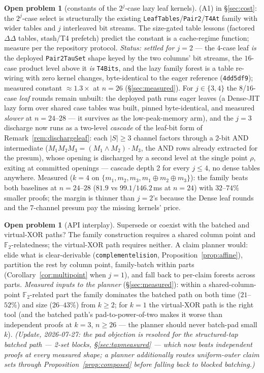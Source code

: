 \documentclass[11pt]{article}
\newcommand{\F}{\mathbb{F}}
\newcommand{\Ftwo}{\F_2}
\DeclareRobustCommand{\code}[1]{{\def\_{\textunderscore\allowbreak}\texttt{#1}}}
\theoremstyle{plain}
\theoremstyle{definition}
\newtheorem{openproblem}[theorem]{Open problem}
\theoremstyle{remark}
\begin{document}
\begin{openproblem}[constants of the $2^{j}$-case lazy leaf kernels]
(A1) in \S\ref{sec:cost}: the $2^{j}$-case select is structurally the
existing \code{LeafTables}/\code{Pair2}/\code{T4At} family with wider tables
and $j$ interleaved bit streams. The size-gated table lessons (factored
$\Delta\Delta$ tables, stash/T4 prefetch) predict the constant is a
cache-regime function; measure per the repository protocol.
\emph{Status: settled for $j=2$} --- the $4$-case leaf \emph{is} the
deployed \code{Pair2TauSet} shape keyed by the two columns' bit streams,
the $16$-case product level above it \emph{is} \code{T4Bits}, and the lazy
family forest is a table re-wiring with zero kernel changes, byte-identical
to the eager reference (\texttt{4dd5df9}); measured constant
${\approx}1.3\times$ at $n=26$ (\S\ref{sec:measured}). For
$j\in\{3,4\}$ the $8$/$16$-case \emph{leaf} rounds remain unbuilt: the
deployed path runs eager leaves (a Dense-JIT lazy form over shared case
tables was built, pinned byte-identical, and measured \emph{slower} at
$n=24$--$28$ --- it survives as the low-peak-memory arm), and the $j=3$
discharge now runs as a two-level \emph{cascade} of the leaf-bit form of
Remark~\ref{rem:dischargeleaf}: each $|S|\ge3$ channel factors through a
2-bit AND intermediate ($M_1M_2M_3=(M_1\wedge M_2)\cdot M_3$, the AND
rows already extracted for the presum), whose opening is discharged by a
second level at the single point $\rho$, exiting at committed openings
--- cascade depth 2 for every $j\le4$, no dense tables anywhere. Measured
($k=4$ on $\{m_1,m_2,m_3,m_1{\oplus}m_2{\oplus}m_3\}$): the family beats
both baselines at $n=24$--$28$ ($81.9$ vs $99.1$/$146.2$\,ms at $n=24$)
with $32$--$74\%$ smaller proofs; the margin is thinner than $j=2$'s
because the Dense leaf rounds and the 7-channel presum pay the missing
kernels' price.
\end{openproblem}

\begin{openproblem}[API interplay]
Supersede or coexist with the batched and virtual-XOR paths? The family
construction requires a shared column point and $\Ftwo$-relatedness;
the virtual-XOR path requires neither. A claim planner would: elide what is
clear-derivable (\code{complement\_elision},
Proposition~\ref{prop:affine}), partition the rest by column point,
family-batch within parts (Corollary~\ref{cor:multipoint} when $j=1$), and
fall back to per-claim forests across parts. \emph{Measured inputs to the
planner} (\S\ref{sec:measured}): within a shared-column-point
$\Ftwo$-related part the family dominates the batched path on both time
($21$--$52\%$) and size ($26$--$43\%$) from $k\ge2$; for $k=1$ the
virtual-XOR path is the right tool (and the batched path's
pad-to-power-of-two makes it worse than independent proofs at $k=3$,
$n\ge26$ --- the planner should never batch-pad small $k$).
\emph{(Update, 2026-07-27: the pad objection is resolved for the
structured-tap batched path --- 2-set blocks,
\S\ref{sec:tapmeasured} --- which now beats independent proofs at
every measured shape; a planner additionally routes uniform-outer
claim sets through Proposition~\ref{prop:composed} before falling
back to blocked batching.)}
\end{openproblem}
\end{document}

